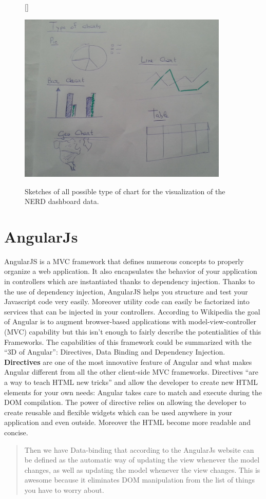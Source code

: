 \documentclass[a4paper,13pt]{report}
\begin{document}
\begin{figure}[H]
[\FBwidth]
{\caption{Sketches of all possible type of chart for the visualization of the NERD dashboard data.}\label{fig:test}}
{\includegraphics[width=10cm]{pics/UISketches/chart1}}
\end{figure}

\section{AngularJs}
AngularJS is a MVC framework that defines numerous concepts to properly organize a web application. It also encapsulates the behavior of your application in controllers which are instantiated thanks to dependency injection. Thanks to the use of dependency injection, AngularJS helps you structure and test your Javascript code very easily. Moreover utility code can easily be factorized into services that can be injected in your controllers.\newline
According to Wikipedia the goal of Angular is to augment browser-based applications with model-view-controller (MVC) capability but this isn't enough to fairly describe the potentialities of this Frameworks.
The capabilities of this framework could be summarized with the ``3D of Angular'': Directives, Data Binding and Dependency Injection.\newline
\textbf{Directives} are one of the most innovative feature of Angular and what makes Angular different from all the other client-side MVC frameworks. Directives ``are a way to teach HTML new tricks'' and allow the developer to create new HTML elements for your own needs: Angular takes care to match and execute during the DOM compilation.
The power of directive relies on allowing the developer to create reusable and flexible widgets which can be used anywhere in your application and even outside. Moreover the HTML become more readable and concise.
\newline
\begin{quotation}
  Then we have Data-binding that according to the AngularJs website can be defined as the automatic way of updating the view whenever the model changes, as well as updating the model whenever the view changes. This is awesome because it eliminates DOM manipulation from the list of things you have to worry about.
\end{quotation}
\end{document}
